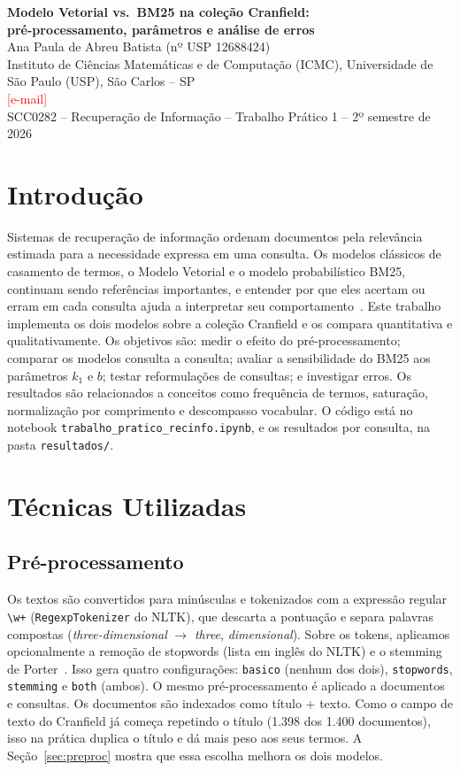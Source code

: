 \documentclass[10pt,a4paper]{article}
\newcommand{\pendente}[1]{\textcolor{red}{#1}}
\newcommand{\term}[1]{\textit{#1}}      %
\begin{document}
\begin{center}
  {\Large\bfseries Modelo Vetorial vs.\ BM25 na coleção Cranfield:\\[2pt]
  pré-processamento, parâmetros e análise de erros}\\[6pt]
  Ana Paula de Abreu Batista (nº USP 12688424)\\
  Instituto de Ciências Matemáticas e de Computação (ICMC), Universidade de São Paulo (USP), São Carlos -- SP\\
  \pendente{[e-mail]}\\[3pt]
  {\small SCC0282 -- Recuperação de Informação -- Trabalho Prático 1 -- 2º semestre de 2026}
\end{center}

\section{Introdução}

Sistemas de recuperação de informação ordenam documentos pela relevância estimada para a necessidade expressa em uma consulta. Os modelos clássicos de casamento de termos, o Modelo Vetorial e o modelo probabilístico BM25, continuam sendo referências importantes, e entender por que eles acertam ou erram em cada consulta ajuda a interpretar seu comportamento~\cite{manning}. Este trabalho implementa os dois modelos sobre a coleção Cranfield e os compara quantitativa e qualitativamente. Os objetivos são: medir o efeito do pré-processamento; comparar os modelos consulta a consulta; avaliar a sensibilidade do BM25 aos parâmetros $k_1$ e $b$; testar reformulações de consultas; e investigar erros. Os resultados são relacionados a conceitos como frequência de termos, saturação, normalização por comprimento e descompasso vocabular. O código está no notebook \texttt{trabalho\_pratico\_recinfo.ipynb}, e os resultados por consulta, na pasta \texttt{resultados/}.

\section{Técnicas Utilizadas}

\subsection{Pré-processamento}
Os textos são convertidos para minúsculas e tokenizados com a expressão regular \verb|\w+| (\texttt{RegexpTokenizer} do NLTK), que descarta a pontuação e separa palavras compostas (\term{three-dimensional} $\to$ \term{three}, \term{dimensional}). Sobre os tokens, aplicamos opcionalmente a remoção de stopwords (lista em inglês do NLTK) e o stemming de Porter~\cite{porter}. Isso gera quatro configurações: \texttt{basico} (nenhum dos dois), \texttt{stopwords}, \texttt{stemming} e \texttt{both} (ambos). O mesmo pré-processamento é aplicado a documentos e consultas. Os documentos são indexados como título + texto. Como o campo de texto do Cranfield já começa repetindo o título (1.398 dos 1.400 documentos), isso na prática duplica o título e dá mais peso aos seus termos. A Seção~\ref{sec:preproc} mostra que essa escolha melhora os dois modelos.
\end{document}
